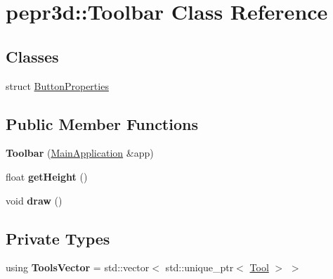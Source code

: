 \hypertarget{classpepr3d_1_1_toolbar}{}\section{pepr3d\+::Toolbar Class Reference}
\label{classpepr3d_1_1_toolbar}
\subsection*{Classes}
\begin{DoxyCompactItemize}
\item 
struct \mbox{\hyperlink{structpepr3d_1_1_toolbar_1_1_button_properties}{Button\+Properties}}
\end{DoxyCompactItemize}
\subsection*{Public Member Functions}
\begin{DoxyCompactItemize}
\item 
\mbox{\label{classpepr3d_1_1_toolbar_a84600ac501c165a06e775e70e5414a5a}} 
{\bfseries Toolbar} (\mbox{\hyperlink{classpepr3d_1_1_main_application}{Main\+Application}} \&app)
\item 
\mbox{\label{classpepr3d_1_1_toolbar_a05d027cd466b54792502653043a8db60}} 
float {\bfseries get\+Height} ()
\item 
\mbox{\label{classpepr3d_1_1_toolbar_ab84f478320ce74f523bede52c0966271}} 
void {\bfseries draw} ()
\end{DoxyCompactItemize}
\subsection*{Private Types}
\begin{DoxyCompactItemize}
\item 
\mbox{\label{classpepr3d_1_1_toolbar_a7d84a6ca9d9aad7afe53b7aecb1fdddf}} 
using {\bfseries Tools\+Vector} = std\+::vector$<$ std\+::unique\+\_\+ptr$<$ \mbox{\hyperlink{classpepr3d_1_1_tool}{Tool}} $>$ $>$
\end{DoxyCompactItemize}
